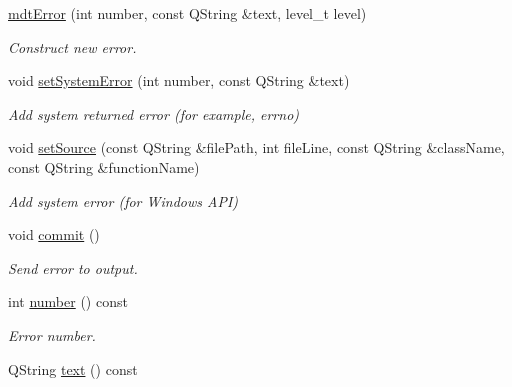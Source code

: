 \begin{DoxyCompactItemize}
\item 
\hypertarget{classmdt_error_a377c175cc8e1aeae543cae2ecc5ca87b}{
\hyperlink{classmdt_error_a377c175cc8e1aeae543cae2ecc5ca87b}{mdtError} (int number, const QString \&text, level\_\-t level)}
\label{classmdt_error_a377c175cc8e1aeae543cae2ecc5ca87b}

\begin{DoxyCompactList}\small\item\em Construct new error. \end{DoxyCompactList}\item 
\hypertarget{classmdt_error_a49254fdb566fee1a4adafe6a3694befc}{
void \hyperlink{classmdt_error_a49254fdb566fee1a4adafe6a3694befc}{setSystemError} (int number, const QString \&text)}
\label{classmdt_error_a49254fdb566fee1a4adafe6a3694befc}

\begin{DoxyCompactList}\small\item\em Add system returned error (for example, errno) \end{DoxyCompactList}\item 
void \hyperlink{classmdt_error_a8dd3203e11b308e6c2701d7f075af885}{setSource} (const QString \&filePath, int fileLine, const QString \&className, const QString \&functionName)
\begin{DoxyCompactList}\small\item\em Add system error (for Windows API) \end{DoxyCompactList}\item 
\hypertarget{classmdt_error_ad3cccf7c7f7d4bdabdcb4e60794bb9cb}{
void \hyperlink{classmdt_error_ad3cccf7c7f7d4bdabdcb4e60794bb9cb}{commit} ()}
\label{classmdt_error_ad3cccf7c7f7d4bdabdcb4e60794bb9cb}

\begin{DoxyCompactList}\small\item\em Send error to output. \end{DoxyCompactList}\item 
\hypertarget{classmdt_error_ad233adb8efe4180b85f584c5afdd49fc}{
int \hyperlink{classmdt_error_ad233adb8efe4180b85f584c5afdd49fc}{number} () const }
\label{classmdt_error_ad233adb8efe4180b85f584c5afdd49fc}

\begin{DoxyCompactList}\small\item\em Error number. \end{DoxyCompactList}\item 
\hypertarget{classmdt_error_a8630bb6b21b70edfe3d13eaff82a1baf}{
QString \hyperlink{classmdt_error_a8630bb6b21b70edfe3d13eaff82a1baf}{text} () const }
\label{classmdt_error_a8630bb6b21b70edfe3d13eaff82a1baf}


\end{DoxyCompactItemize}
